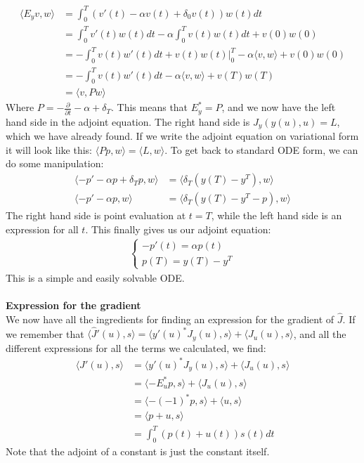 \documentclass[11pt,a4paper]{article}
\begin{document}
\begin{align*}
\langle E_yv,w \rangle &=  \int_0^T(v'(t)-\alpha v(t)+\delta_0v(t))w(t)dt \\ &= \int_0^Tv'(t)w(t)dt -\alpha\int_0^Tv(t)w(t) dt +v(0)w(0) \\
& = -\int_0^Tv(t)w'(t)dt +v(t)w(t)|_0^T-\alpha\langle v,w\rangle +v(0)w(0) \\
&=-\int_0^Tv(t)w'(t)dt -\alpha\langle v,w\rangle +v(T)w(T) \\
&= \langle v,Pw \rangle
\end{align*} 
Where $P=-\frac{\partial}{\partial t} -\alpha + \delta_T$. This means that $E_y^* = P$, and we now have the left hand side in the adjoint equation. The right hand side is $J_y(y(u),u)=L$, which we have already found. If we write the  adjoint equation on variational form it will look like this: $\langle Pp,w\rangle = \langle L,w\rangle$. To get back to standard ODE form, we can do some manipulation: 
\begin{align*}
\langle -p'-\alpha p +\delta_T p,w \rangle &= \langle \delta_T(y(T)-y^T),w\rangle \\
\langle -p'-\alpha p ,w \rangle &= \langle \delta_T(y(T)-y^T -p),w\rangle
\end{align*}
The right hand side is point evaluation at $t=T$, while the left hand side is an expression for all $t$. This finally gives us our adjoint equation: 
\begin{align*}
   \left\{
     \begin{array}{lr}
       -p'(t) = \alpha p(t) \\
       p(T) = y(T)-y^T
     \end{array}
   \right.
\end{align*}
This is a simple and easily solvable ODE.
\\
\\
\textbf{Expression for the gradient}
\\
We now have all the ingredients for finding an expression for the gradient of $\hat{J}$. If we remember that $\langle\hat{J}'(u),s\rangle=\langle y'(u)^*J_y(u),s\rangle +\langle J_u(u),s\rangle$, and all the different expressions for all the terms we calculated, we find:
\begin{align*}
\langle\hat{J}'(u),s\rangle&=\langle y'(u)^*J_y(u),s\rangle +\langle J_u(u),s\rangle \\ &=\langle -E_u^*p,s\rangle +\langle J_u(u),s\rangle \\
&=\langle -(-1)^*p,s\rangle +\langle u,s\rangle \\
&=\langle p+u,s\rangle \\
&= \int_0^T(p(t)+u(t))s(t)dt
\end{align*} 
Note that the adjoint of a constant is just the constant itself.
\end{document}
